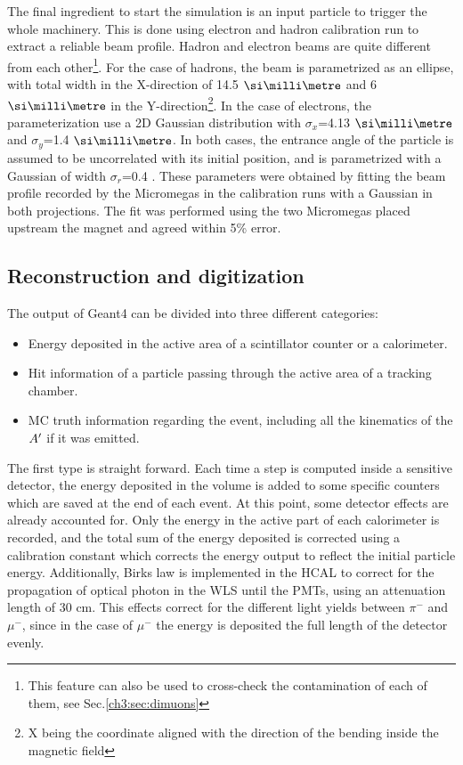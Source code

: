 The final ingredient to start the simulation is an input particle to trigger the whole machinery. This is done using electron and hadron calibration run to extract a reliable beam profile. Hadron and electron beams are quite different from each other\footnote{This feature can also be used to cross-check the contamination of each of them, see Sec.\ref{ch3:sec:dimuons}}. For the case of hadrons, the beam is parametrized as an ellipse, with total width in the X-direction of 14.5 $\mmi$ and 6 $\mmi$ in the Y-direction\footnote{X being the coordinate aligned with the direction of the bending inside the magnetic field}. In the case of electrons, the parameterization use a 2D Gaussian distribution with $\sigma_x$=4.13 $\mmi$ and $\sigma_y$=1.4 $\mmi$. In both cases, the entrance angle of the particle is assumed to be uncorrelated with its initial position, and is parametrized with a Gaussian of width $\sigma_r$=0.4 \mrad. These parameters were obtained by fitting the beam profile recorded by the Micromegas in the calibration runs with a Gaussian in both projections. The fit was performed using the two Micromegas placed upstream the magnet and agreed within 5\% error.

\subsection{Reconstruction and digitization}
\label{ch3:sec:geant4-digitization}

The output of Geant4 can be divided into three different categories:

\begin{itemize}
\item Energy deposited in the active area of a scintillator counter or a calorimeter.
\item Hit information of a particle passing through the active area of a tracking chamber.
\item MC truth information regarding the event, including all the kinematics of the $A'$ if it was emitted.
\end{itemize}

The first type is straight forward. Each time a step is computed inside a sensitive detector, the energy deposited in the volume is added to some specific counters which are saved at the end of each event. At this point, some detector effects are already accounted for. Only the energy in the active part of each calorimeter is recorded, and the total sum of the energy deposited is corrected using a calibration constant which corrects the energy output to reflect the initial particle energy. Additionally, Birks law \cite{NYIBULE2014141} is implemented in the HCAL to correct for the propagation of optical photon in the WLS until the PMTs, using an attenuation length of 30 \si{\centi\meter}. This effects correct for the different light yields between $\pi^-$ and $\mu^-$, since in the case of $\mu^-$ the energy is deposited the full length of the detector evenly.

